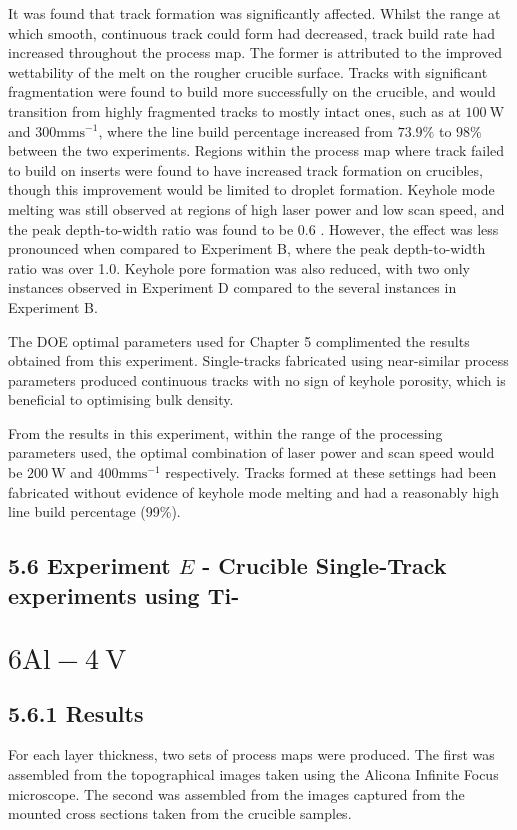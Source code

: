 \documentclass[10pt]{article}
\begin{document}
It was found that track formation was significantly affected. Whilst the range at which smooth, continuous track could form had decreased, track build rate had increased throughout the process map. The former is attributed to the improved wettability of the melt on the rougher crucible surface. Tracks with significant fragmentation were found to build more successfully on the crucible, and would transition from highly fragmented tracks to mostly intact ones, such as at $100 \mathrm{~W}$ and $300 \mathrm{mms}^{-1}$, where the line build percentage increased from $73.9 \%$ to $98 \%$ between the two experiments. Regions within the process map where track failed to build on inserts were found to have increased track formation on crucibles, though this improvement would be limited to droplet formation. Keyhole mode melting was still observed at regions of high laser power and low scan speed, and the peak depth-to-width ratio was found to be 0.6 . However, the effect was less pronounced when compared to Experiment B, where the peak depth-to-width ratio was over 1.0. Keyhole pore formation was also reduced, with two only instances observed in Experiment D compared to the several instances in Experiment B.

The DOE optimal parameters used for Chapter 5 complimented the results obtained from this experiment. Single-tracks fabricated using near-similar process parameters produced continuous tracks with no sign of keyhole porosity, which is beneficial to optimising bulk density.

From the results in this experiment, within the range of the processing parameters used, the optimal combination of laser power and scan speed would be $200 \mathrm{~W}$ and $400 \mathrm{mms}^{-1}$ respectively. Tracks formed at these settings had been fabricated without evidence of keyhole mode melting and had a reasonably high line build percentage (99\%).

\subsection*{5.6 Experiment $E$ - Crucible Single-Track experiments using Ti-}
\section*{$6 \mathrm{Al}-4 \mathrm{~V}$}
\subsection*{5.6.1 Results}
For each layer thickness, two sets of process maps were produced. The first was assembled from the topographical images taken using the Alicona Infinite Focus microscope. The second was assembled from the images captured from the mounted cross sections taken from the crucible samples.
\end{document}
